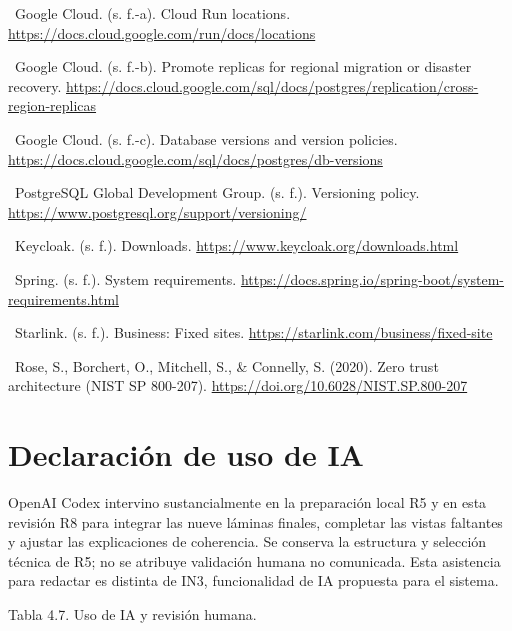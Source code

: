 \documentclass[11pt,letterpaper]{report}
\begin{document}
\noindent\textbullet\ Google Cloud. (s. f.-a). Cloud Run locations. \url{https://docs.cloud.google.com/run/docs/locations}\par
\noindent\textbullet\ Google Cloud. (s. f.-b). Promote replicas for regional migration or disaster recovery. \url{https://docs.cloud.google.com/sql/docs/postgres/replication/cross-region-replicas}\par
\noindent\textbullet\ Google Cloud. (s. f.-c). Database versions and version policies. \url{https://docs.cloud.google.com/sql/docs/postgres/db-versions}\par
\noindent\textbullet\ PostgreSQL Global Development Group. (s. f.). Versioning policy. \url{https://www.postgresql.org/support/versioning/}\par
\noindent\textbullet\ Keycloak. (s. f.). Downloads. \url{https://www.keycloak.org/downloads.html}\par
\noindent\textbullet\ Spring. (s. f.). System requirements. \url{https://docs.spring.io/spring-boot/system-requirements.html}\par
\noindent\textbullet\ Starlink. (s. f.). Business: Fixed sites. \url{https://starlink.com/business/fixed-site}\par
\noindent\textbullet\ Rose, S., Borchert, O., Mitchell, S., \& Connelly, S. (2020). Zero trust architecture (NIST SP 800-207). \url{https://doi.org/10.6028/NIST.SP.800-207}\par
\section*{Declaración de uso de IA}
OpenAI Codex intervino sustancialmente en la preparación local R5 y en esta revisión R8 para integrar las nueve láminas finales, completar las vistas faltantes y ajustar las explicaciones de coherencia. Se conserva la estructura y selección técnica de R5; no se atribuye validación humana no comunicada. Esta asistencia para redactar es distinta de IN3, funcionalidad de IA propuesta para el sistema.

Tabla 4.7. Uso de IA y revisión humana.
\end{document}
